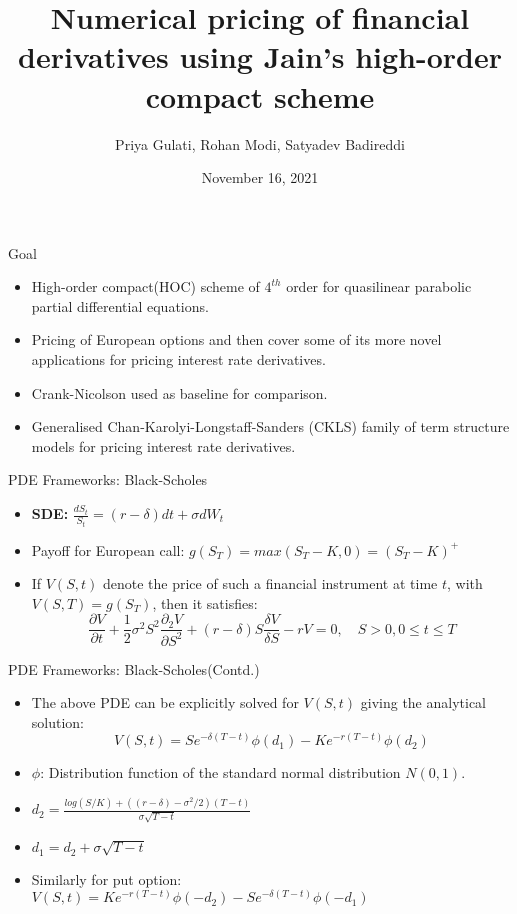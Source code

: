 \documentclass{beamer}
\title{Numerical pricing of financial derivatives using
Jain’s high-order compact scheme}
\author{Priya Gulati, Rohan Modi, Satyadev Badireddi}
\date{November 16, 2021}
\begin{document}
 
\frame{\titlepage}
 
\begin{frame}{Goal}
\begin{itemize}
    \item High-order compact(HOC) scheme of $4^{th}$ order for quasilinear parabolic partial differential equations.
    \item Pricing of European options and then cover some of its more novel applications for pricing interest rate derivatives.
    \item Crank-Nicolson used as baseline for comparison.
    \item Generalised Chan-Karolyi-Longstaff-Sanders (CKLS) family of term structure models for pricing interest rate derivatives.
\end{itemize}
 
\end{frame}
 
\begin{frame}{PDE Frameworks: Black-Scholes}
 
\begin{itemize}
    \item \textbf{SDE: } $\frac{dS_{t}}{S_{t}} = (r-\delta)dt + \sigma dW_{t}$
    \item Payoff for European call: $g(S_{T}) = max(S_{T}-K, 0) = (S_{T}-K)^{+}$
    \item If $V(S,t)$ denote the price of such a financial instrument at time $t$, with $V(S,T) = g(S_{T})$, then it satisfies:
    \begin{equation*}
    \frac{\partial V}{\partial t}+\frac{1}{2}\sigma^{2}S^{2}\frac{\partial_{2}V}{\partial S^{2}} + (r-\delta)S\frac{\delta V}{\delta S} -rV = 0, \quad S>0, 0\le t \le T
\end{equation*}
\end{itemize}
 
\end{frame}
 
\begin{frame}{PDE Frameworks: Black-Scholes(Contd.)}
\begin{itemize}
    \item The above PDE can be explicitly solved for $V(S,t)$ giving the analytical solution:
\begin{equation*}
    V(S,t) = Se^{-\delta(T-t)}\phi(d_{1})-Ke^{-r(T-t)}\phi(d_{2})
\end{equation*}
\item $\phi$: Distribution function of the standard normal distribution $N(0,1)$.
\item $d_{2} = \frac{log(S/K) + ((r-\delta) - \sigma^{2}/2)(T-t)}{\sigma \sqrt{T-t}}$
\item $d_{1} = d_{2} + \sigma \sqrt{T-t}$
\item Similarly for put option: $V(S,t) = Ke^{-r(T-t)}\phi(-d_{2}) - Se^{-\delta(T-t)}\phi(-d_{1})$
\end{itemize}
\end{frame}
 
\end{document}
